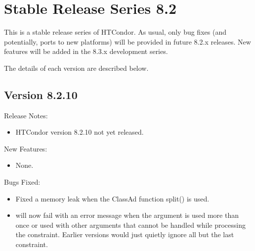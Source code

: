 
\section{\label{sec:History-8-2}Stable Release Series 8.2}

This is a stable release series of HTCondor.
As usual, only bug fixes (and potentially, ports to new platforms)
will be provided in future 8.2.x releases.
New features will be added in the 8.3.x development series.

The details of each version are described below.


\subsection*{\label{sec:New-8-2-10}Version 8.2.10}

\noindent Release Notes:

\begin{itemize}

\item HTCondor version 8.2.10 not yet released.

\end{itemize}


\noindent New Features:

\begin{itemize}

\item None.

\end{itemize}

\noindent Bugs Fixed:

\begin{itemize}

\item Fixed a memory leak when the ClassAd function split() is used.

\item {} will now fail with an error message when the 
argument is used more than once or used with other arguments that cannot be handled
while processing the constraint.  Earlier versions would just quietly ignore all but
the last constraint.

\end{itemize}

